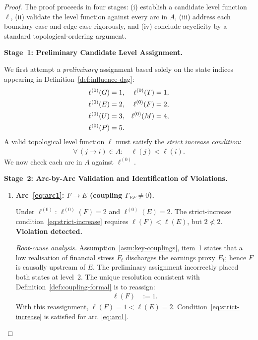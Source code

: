 \documentclass[12pt,openany]{book}
\newcommand{\calE}{\mathcal{E}}
\newcommand{\calF}{\mathcal{F}}
\newcommand{\calG}{\mathcal{G}}
\newcommand{\calP}{\mathcal{P}}
\newcommand{\calU}{\mathcal{U}}
\newcommand{\calM}{\mathcal{M}}
\newcommand{\calT}{\mathcal{T}}
\numberwithin{equation}{chapter}
\theoremstyle{plain}
\theoremstyle{definition}
\theoremstyle{remark}
\def\mathcal#1{#1}%
\begin{document}
\begin{proof}
The proof proceeds in four stages: (i) establish a candidate
level function $\ell$, (ii) validate the level function against
every arc in $\mathcal{A}$, (iii) address each boundary case and
edge case rigorously, and (iv) conclude acyclicity by a standard
topological-ordering argument.

\medskip
\noindent\textbf{Stage~1: Preliminary Candidate Level Assignment.}

\noindent
We first attempt a \emph{preliminary} assignment based solely on
the state indices appearing in
Definition~\ref{def:influence-dag}:
\begin{align}
  \ell^{(0)}(\calG) &= 1,  &  \ell^{(0)}(\calT) &= 1, \notag \\
  \ell^{(0)}(\calE) &= 2,  &  \ell^{(0)}(\calF) &= 2, \notag \\
  \ell^{(0)}(\calU) &= 3,  &  \ell^{(0)}(\calM) &= 4, \notag \\
  \ell^{(0)}(\calP) &= 5.  &                    &
  \label{eq:levels-prelim}
\end{align}
A valid topological level function $\ell$ must satisfy the
\emph{strict increase condition}:
\begin{align}
  \forall\,(j \to i)\in\mathcal{A}:\quad
  \ell(j) < \ell(i).
  \label{eq:strict-increase}
\end{align}
We now check each arc in $\mathcal{A}$ against
$\ell^{(0)}$.

\medskip
\noindent\textbf{Stage~2: Arc-by-Arc Validation and
Identification of Violations.}

\begin{enumerate}
  \item \textbf{Arc~\eqref{eq:arc1}:
        $\calF \to \calE$
        (coupling $\Gamma_{\calE\calF} \neq 0$).}

        Under $\ell^{(0)}$:
        $\ell^{(0)}(\calF) = 2$ and
        $\ell^{(0)}(\calE) = 2$.
        The strict-increase condition~\eqref{eq:strict-increase}
        requires $\ell(\calF) < \ell(\calE)$, but
        $2 \not< 2$.
        \textbf{Violation detected.}

        \emph{Root-cause analysis.}
        Assumption~\ref{asm:key-couplings}, item~1 states
        that a low realisation of financial stress
        $\calF_t$ discharges the earnings proxy
        $\calE_t$; hence $\calF$ is causally upstream of
        $\calE$.  The preliminary assignment
        incorrectly placed both states at level~2.
        The unique resolution consistent with
        Definition~\ref{def:coupling-formal} is to
        reassign:
        \begin{align}
          \ell(\calF) &:= 1. \label{eq:reassign-F}
        \end{align}
        With this reassignment,
        $\ell(\calF) = 1 < \ell(\calE) = 2$.
        Condition~\eqref{eq:strict-increase} is satisfied
        for arc~\eqref{eq:arc1}.  \checkmark


\end{enumerate}
\end{proof}
\end{document}
